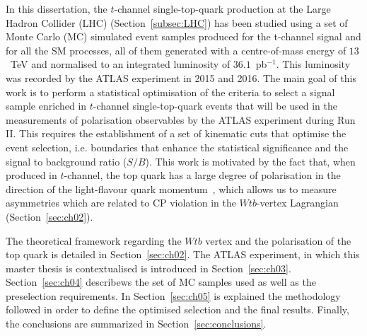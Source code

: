In this dissertation, the $t$-channel single-top-quark production at the Large Hadron Collider (LHC) (Section~\ref{subsec:LHC}) has been studied using a set of Monte Carlo (MC) simulated event samples produced for the t-channel signal and for all the SM processes, all of
them generated with a centre-of-mass energy of $13$~TeV and normalised to an integrated luminosity of $36.1$~pb$^{-1}$. This luminosity was recorded by the ATLAS experiment in 2015 and 2016. 
The main goal of this work is to perform a statistical optimisation of the criteria to select a signal sample enriched in $t$-channel single-top-quark events that will be used in the measurements of polarisation observables by the ATLAS experiment during Run II. This requires the establishment of a set of kinematic cuts that optimise the event selection, i.e. boundaries that enhance the statistical significance and the signal to background ratio ($S/B$). This work is motivated by the fact that, when produced in $t$-channel, the top quark has a large degree of polarisation in the direction of the light-flavour quark momentum~\cite{Mahlon:1996pn}, which allows us to measure asymmetries which are related to CP violation in the $Wtb$-vertex Lagrangian (Section~\ref{sec:ch02}). 

The theoretical framework regarding the $Wtb$ vertex and the polarisation of the top quark is detailed in Section~\ref{sec:ch02}. The ATLAS experiment, in which this master thesis is contextualised is introduced in Section~\ref{sec:ch03}. Section~\ref{sec:ch04} describews the set of MC samples used as well as the preselection requirements. In Section~\ref{sec:ch05} is explained the methodology followed in order to define the optimised selection and the final results. Finally, the conclusions are summarized in Section~\ref{sec:conclusions}.


